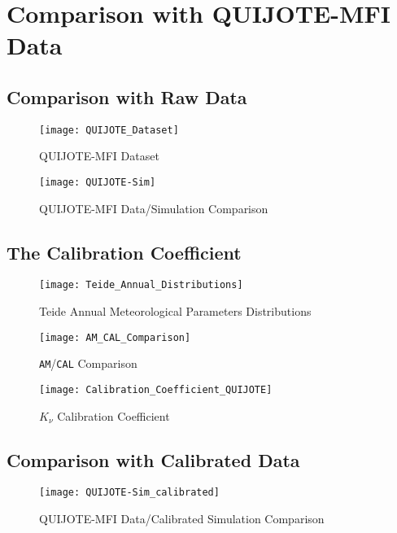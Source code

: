 \chapter{Comparison with QUIJOTE-MFI Data}

\section{Comparison with Raw Data}

\begin{figure}
        \centering
        \texttt{[image: QUIJOTE\_Dataset]}
        \caption{QUIJOTE-MFI Dataset}
        \label{fig:quijote_dataset}
\end{figure}

\begin{figure}
        \centering
        \texttt{[image: QUIJOTE-Sim]}
        \caption{QUIJOTE-MFI Data/Simulation Comparison}
        \label{fig:quijote_sim}
\end{figure}

\section{The Calibration Coefficient}

\begin{figure}
        \centering
        \texttt{[image: Teide\_Annual\_Distributions]}
        \caption{Teide Annual Meteorological Parameters Distributions}
        \label{fig:teide_annual_distributions}
\end{figure}

\begin{figure}
        \centering
        \texttt{[image: AM\_CAL\_Comparison]}
        \caption{\texttt{AM}/\texttt{CAL} Comparison}
        \label{fig:am_cal_comparison}
\end{figure}

\begin{figure}
        \centering
        \texttt{[image: Calibration\_Coefficient\_QUIJOTE]}
        \caption{$K_\nu$ Calibration Coefficient}
        \label{fig:calibration_coefficient_quijote}
\end{figure}

\section{Comparison with Calibrated Data}

\begin{figure}
        \centering
        \texttt{[image: QUIJOTE-Sim\_calibrated]}
        \caption{QUIJOTE-MFI Data/Calibrated Simulation Comparison}
        \label{fig:quijote_sim_calibrated}
\end{figure}

